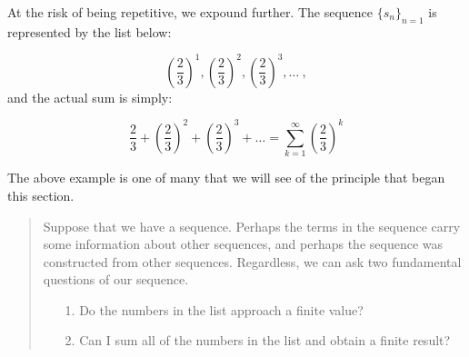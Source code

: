 \documentclass{ximera}
\begin{document}
\begin{example}
\begin{question}
\begin{explanation}
\begin{remark}
At the risk of being repetitive, we expound further.  The sequence $\{s_n\}_{n=1}$ is represented by the list below:

\[
\left(\frac{2}{3}\right)^1 , \left(\frac{2}{3}\right)^2 ,  \left(\frac{2}{3}\right)^3 , \ldots  ~, 
\]
and the actual sum is simply:

\[
\frac{2}{3} + \left(\frac{2}{3}\right)^2 +  \left(\frac{2}{3}\right)^3 + \ldots    = \sum_{k=1}^{\infty} \left(\frac{2}{3}\right)^k
\]
\end{remark}

\end{explanation}

\end{question}
\end{example}

\begin{remark}
The above example is one of many that we will see of the principle that began this section.

\begin{quote}
Suppose that we have a sequence.  Perhaps the terms in the sequence carry some information about other sequences, and perhaps the sequence was constructed from other sequences.  Regardless, we can ask two fundamental questions of our sequence.  

\begin{itemize}
\item[1.] Do the numbers in the list approach a finite value?
\item[2.] Can I sum all of the numbers in the list and obtain a finite result?
\end{itemize}
\end{quote}
\end{remark}
\end{document}
